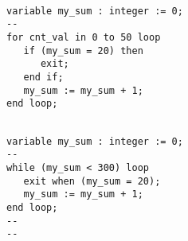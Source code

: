\vspace{10pt}
\noindent
\begin{minipage}{0.5\linewidth}
\begin{lstlisting}

variable my_sum : integer := 0;
--
for cnt_val in 0 to 50 loop
   if (my_sum = 20) then
      exit;
   end if;
   my_sum := my_sum + 1;
end loop;
\end{lstlisting}
\end{minipage}
\noindent
\begin{minipage}{0.49\linewidth}
\begin{lstlisting}

variable my_sum : integer := 0;
--
while (my_sum < 300) loop
   exit when (my_sum = 20);
   my_sum := my_sum + 1;
end loop;
--
--
\end{lstlisting}
\end{minipage}
